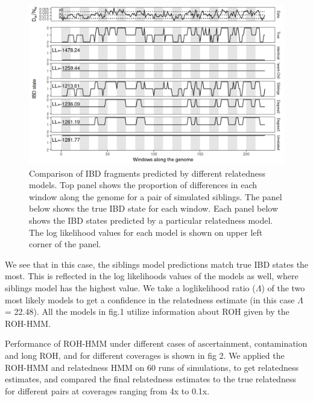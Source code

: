 \documentclass[12pt, letterpaper]{article}
\begin{document}
\begin{figure}[htp]
    \centering
    \includegraphics[width=18cm]{plots/plotimg/IBDplot.png}
    \caption{Comparison of IBD fragments predicted by different relatedness models. Top panel shows the proportion of differences in each window along the genome for a pair of simulated siblings. The panel below shows the true IBD state for each window. Each panel below shows the IBD states predicted by a particular relatedness model. The log likelihood values for each model is shown on upper left corner of the panel. }
    \label{fig:ibd}
\end{figure}


We see that in this case, the siblings model predictions match true IBD states the most. This is reflected in the log likelihoods values of the models as well, where siblings model has the highest value. We take a loglikelihood ratio ($\Lambda$) of the two most likely models to get a confidence in the relatedness estimate (in this case $\Lambda$ = 22.48). All the models in fig.1 utilize information about ROH given by the ROH-HMM. 


Performance of ROH-HMM under different cases of ascertainment, contamination and long ROH, and for different coverages is shown in fig 2. We applied the ROH-HMM and relatedness HMM on 60 runs of simulations, to get relatedness estimates, and compared the final relatedness estimates to the true relatedness for different pairs at coverages ranging from 4x to 0.1x. 
\end{document}
